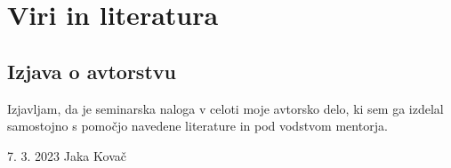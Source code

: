 \documentclass[12pt]{article}
\begin{document}
\newpage

\begingroup
\makeatletter
        \section{Viri in literatura}
        \nocite{*}
        \printbibliography[heading=none]
\makeatother
\endgroup
\newpage

\begin{samepage}
    \thispagestyle{empty}
    \section*{Izjava o avtorstvu}
    Izjavljam, da je seminarska naloga v celoti moje avtorsko delo, ki sem ga 
    izdelal samostojno s pomočjo navedene literature in pod vodstvom mentorja.

    \vfill
    
    7. 3. 2023 \hfill Jaka Kovač
    
    \vspace{3 cm}
\end{samepage}
\end{document}
